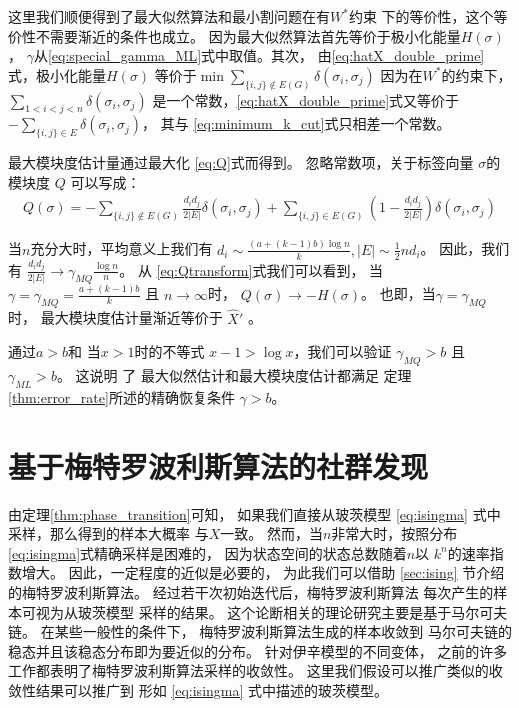 这里我们顺便得到了最大似然算法和最小割问题在有$W^*$约束
下的等价性，这个等价性不需要渐近的条件也成立。
因为最大似然算法首先等价于极小化能量$H(\sigma)$，
$\gamma$从\eqref{eq:special_gamma_ML}式中取值。其次，
由\eqref{eq:hatX_double_prime}式，极小化能量$H(\sigma)$
等价于$\min \sum_{\{i,j\} \not\in E(G) } \delta(\sigma_i, \sigma_j)$
因为在$W^*$的约束下，
$\sum_{1<i<j<n} \delta(\sigma_i, \sigma_j)$
是一个常数，\eqref{eq:hatX_double_prime}式又等价于
$-\sum_{ \{i,j\} \in E} \delta(\sigma_i, \sigma_j)$，
其与 \eqref{eq:minimum_k_cut}式只相差一个常数。


最大模块度估计量通过最大化 \ref{eq:Q}式而得到。
忽略常数项，关于标签向量 $\sigma$的模块度 $Q$
可以写成：
\begin{align}
Q(\sigma) = -\sum_{\{i,j\} \not\in E(G) } \frac{d_i d_j}{2 |E|}\delta(\sigma_i,\sigma_j) 
+ \sum_{\{i,j\} \in E(G) } (1 - \frac{d_i d_j}{2 |E|}) \delta(\sigma_i,\sigma_j)  \label{eq:Qtransform}
\end{align}

当$n$充分大时，平均意义上我们有 $d_i \sim  \frac{(a+(k-1)b)\log n}{k}, |E| \sim \frac{1}{2}n d_i$。
因此，我们有
$\frac{d_id_j}{2|E|} \to \gamma_{MQ} \frac{\log n}{n} $。
从 \eqref{eq:Qtransform}式我们可以看到，
当 $\gamma = \gamma_{MQ} = \frac{a+(k-1)b}{k}$ 且 $n\to \infty$时，
$Q(\sigma) \to -H(\sigma)$。
也即，当$\gamma = \gamma_{MQ}$ 时，
最大模块度估计量渐近等价于
$\hat{X}'$ 。


通过$a>b$和 当$x>1$时的不等式 
 $x-1>\log x $，我们可以验证
  $\gamma_{MQ} >b$ 且  $\gamma_{ML} > b$。
  这说明 了
  最大似然估计和最大模块度估计都满足
  定理\ref{thm:error_rate}所述的精确恢复条件 $\gamma > b $。

\section{基于梅特罗波利斯算法的社群发现}\label{sec:ms}

由定理\ref{thm:phase_transition}可知，
如果我们直接从玻茨模型 \eqref{eq:isingma} 式中采样，那么得到的样本大概率
与$X$一致。
然而，当$n$非常大时，按照分布\eqref{eq:isingma}式精确采样是困难的，
因为状态空间的状态总数随着$n$以
$k^n$的速率指数增大。
因此，一定程度的近似是必要的，
为此我们可以借助 \ref{sec:ising} 节介绍的梅特罗波利斯算法。 
经过若干次初始迭代后，梅特罗波利斯算法
每次产生的样本可视为从玻茨模型 采样的结果。
这个论断相关的理论研究主要是基于马尔可夫链。
在某些一般性的条件下，
梅特罗波利斯算法生成的样本收敛到
马尔可夫链的稳态并且该稳态分布即为要近似的分布。
针对伊辛模型的不同变体，
之前的许多工作都表明了梅特罗波利斯算法采样的收敛性\cite{diaconis1998we}。
这里我们假设可以推广类似的收敛性结果可以推广到
形如 \eqref{eq:isingma} 式中描述的玻茨模型。

